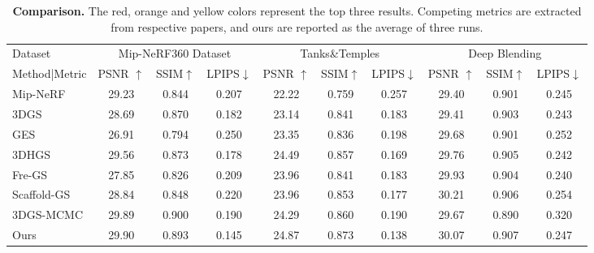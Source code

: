 \documentclass[letterpaper]{article} %
\begin{document}






\begin{table*}[tb]
\begin{tabular}{l|ccc|ccc|ccc}
\bottomrule
    Dataset & \multicolumn{3}{c|}{Mip-NeRF360 Dataset}  & \multicolumn{3}{c|}{Tanks\&Temples} & \multicolumn{3}{c}{Deep Blending}\\
    Method|Metric & PSNR $\uparrow$   & SSIM$\uparrow$   & LPIPS$\downarrow$ & PSNR $\uparrow$   & SSIM$\uparrow$   & LPIPS$\downarrow$ & PSNR $\uparrow$   & SSIM$\uparrow$   & LPIPS$\downarrow$ \\
    \hline 
    Mip-NeRF & 29.23 & 0.844 & 0.207 & 22.22 & 0.759 & 0.257 & 29.40 & 0.901 & 0.245\\
    3DGS & 28.69 & 0.870 & \cellcolor{yellow!40}0.182 & 23.14 & 0.841 & 0.183 & 29.41 & 0.903 & \cellcolor{yellow!40}0.243\\
    GES & 26.91 & 0.794 & 0.250 & 23.35 & 0.836 & 0.198 & 29.68 & 0.901 & 0.252\\
    3DHGS & \cellcolor{yellow!40}29.56 & \cellcolor{yellow!40}0.873 & \cellcolor{orange!40}0.178 & \cellcolor{orange!40}24.49 & \cellcolor{yellow!40}0.857 & \cellcolor{orange!40}0.169 & 29.76 & \cellcolor{yellow!40}0.905 & \cellcolor{orange!40}0.242\\
    Fre-GS & 27.85 & 0.826 & 0.209 & 23.96 & 0.841 & 0.183 & \cellcolor{yellow!40}29.93 & 0.904 & \cellcolor{red!40}0.240\\
    Scaffold-GS & 28.84 & 0.848 & 0.220 & 23.96 & 0.853 & \cellcolor{yellow!40}0.177 & \cellcolor{red!40}30.21 & \cellcolor{orange!40}0.906 & 0.254\\
    3DGS-MCMC & \cellcolor{orange!40}29.89 & \cellcolor{red!40}0.900 & 0.190 & \cellcolor{yellow!40}24.29 & \cellcolor{orange!40}0.860 & 0.190 & 29.67 & 0.890 & 0.320\\
    \midrule 
    Ours & \cellcolor{red!40}29.90 & \cellcolor{orange!40}0.893 & \cellcolor{red!40}0.145 & \cellcolor{red!40}24.87 & \cellcolor{red!40} 0.873 & \cellcolor{red!40} 0.138 & \cellcolor{orange!40}30.07 & \cellcolor{red!40}0.907 & 0.247\\
    \bottomrule
\end{tabular}
\caption{
    \textbf{Comparison.} The red, orange and yellow colors represent the top three results. Competing metrics are extracted from respective papers, and ours are reported as the average of three runs.
}
\label{tab:comparisons}
\end{table*}
\end{document}
